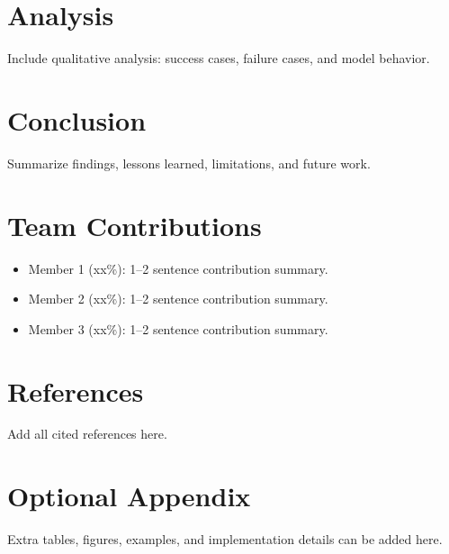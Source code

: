 \documentclass[11pt,a4paper]{article}
\begin{document}
\section{Analysis}
Include qualitative analysis: success cases, failure cases, and model behavior.

\section{Conclusion}
Summarize findings, lessons learned, limitations, and future work.

\section*{Team Contributions}
\begin{itemize}[leftmargin=*]
    \item Member 1 (xx\%): 1--2 sentence contribution summary.
    \item Member 2 (xx\%): 1--2 sentence contribution summary.
    \item Member 3 (xx\%): 1--2 sentence contribution summary.
\end{itemize}

\section*{References}
Add all cited references here.

\appendix
\section{Optional Appendix}
Extra tables, figures, examples, and implementation details can be added here.
\end{document}

